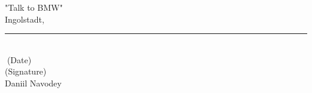 


"Talk to BMW"\\ 
	
Ingolstadt, \rule{0.3\textwidth}{0.4pt}	\\
\textcolor{white}{.}\qquad\qquad\qquad\qquad\quad \small (Date) \\ [1.3cm]
	
(Signature) \\
Daniil Navodey
